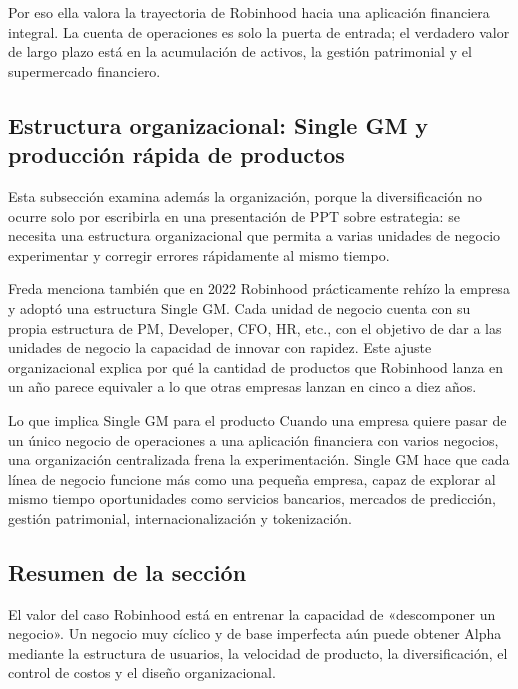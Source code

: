 Por eso ella valora la trayectoria de Robinhood hacia una aplicación financiera integral. La cuenta de operaciones es solo la puerta de entrada; el verdadero valor de largo plazo está en la acumulación de activos, la gestión patrimonial y el supermercado financiero.

\subsection{Estructura organizacional: Single GM y producción rápida de productos}

Esta subsección examina además la organización, porque la diversificación no ocurre solo por escribirla en una presentación de PPT sobre estrategia: se necesita una estructura organizacional que permita a varias unidades de negocio experimentar y corregir errores rápidamente al mismo tiempo.

Freda menciona también que en 2022 Robinhood prácticamente rehízo la empresa y adoptó una estructura Single GM. Cada unidad de negocio cuenta con su propia estructura de PM, Developer, CFO, HR, etc., con el objetivo de dar a las unidades de negocio la capacidad de innovar con rapidez. Este ajuste organizacional explica por qué la cantidad de productos que Robinhood lanza en un año parece equivaler a lo que otras empresas lanzan en cinco a diez años.

\begin{importantbox}{Lo que implica Single GM para el producto}
Cuando una empresa quiere pasar de un único negocio de operaciones a una aplicación financiera con varios negocios, una organización centralizada frena la experimentación. Single GM hace que cada línea de negocio funcione más como una pequeña empresa, capaz de explorar al mismo tiempo oportunidades como servicios bancarios, mercados de predicción, gestión patrimonial, internacionalización y tokenización.
\end{importantbox}

\subsection{Resumen de la sección}

El valor del caso Robinhood está en entrenar la capacidad de «descomponer un negocio». Un negocio muy cíclico y de base imperfecta aún puede obtener Alpha mediante la estructura de usuarios, la velocidad de producto, la diversificación, el control de costos y el diseño organizacional.
